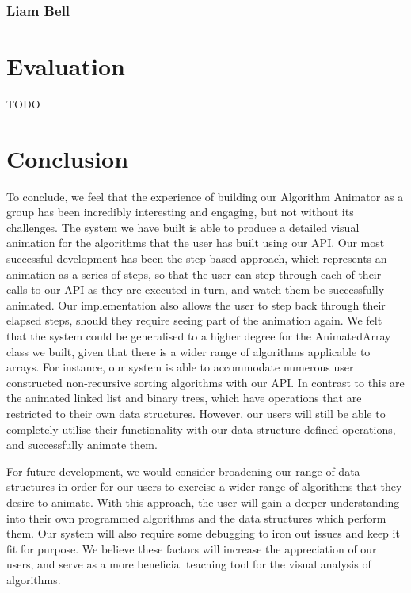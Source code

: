 \documentclass{l3proj}
\begin{document}
\subsection{Liam Bell}

\chapter{Evaluation}

TODO

\chapter{Conclusion}
To conclude, we feel that the experience of building our Algorithm Animator as a group has been incredibly interesting and engaging, but not without its challenges. The system we have built is able to produce a detailed visual animation for the algorithms that the user has built using our API. Our most successful development has been the step-based approach, which represents an animation as a series of steps, so that the user can step through each of their calls to our API as they are executed in turn, and watch them be successfully animated. Our implementation also allows the user to step back through their elapsed steps, should they require seeing part of the animation again.
We felt that the system could be generalised to a higher degree for the AnimatedArray class we built, given that there is a wider range of algorithms applicable to arrays. For instance, our system is able to accommodate numerous user constructed non-recursive sorting algorithms with our API. In contrast to this are the animated linked list and binary trees, which have operations that are restricted to their own data structures. However, our users will still be able to completely utilise their functionality with our data structure defined operations, and successfully animate them.

For future development, we would consider broadening our range of data structures in order for our users to exercise a wider range of algorithms that they desire to animate. With this approach, the user will gain a deeper understanding into their own programmed algorithms and the data structures which perform them.
Our system will also require some debugging to iron out issues and keep it fit for purpose. We believe these factors will increase the appreciation of our users, and serve as a more beneficial teaching tool for the visual analysis of algorithms.
\end{document}
